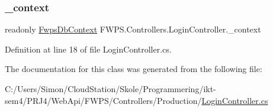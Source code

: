 \subsubsection{\texorpdfstring{\+\_\+context}{\_context}}
{\footnotesize\ttfamily readonly \mbox{\hyperlink{class_f_w_p_s_1_1_data_1_1_fwps_db_context}{Fwps\+Db\+Context}} F\+W\+P\+S.\+Controllers.\+Login\+Controller.\+\_\+context\hspace{0.3cm}{\ttfamily [private]}}



Definition at line 18 of file Login\+Controller.\+cs.



The documentation for this class was generated from the following file\+:\begin{DoxyCompactItemize}
\item 
C\+:/\+Users/\+Simon/\+Cloud\+Station/\+Skole/\+Programmering/ikt-\/sem4/\+P\+R\+J4/\+Web\+Api/\+F\+W\+P\+S/\+Controllers/\+Production/\mbox{\hyperlink{_login_controller_8cs}{Login\+Controller.\+cs}}\end{DoxyCompactItemize}
